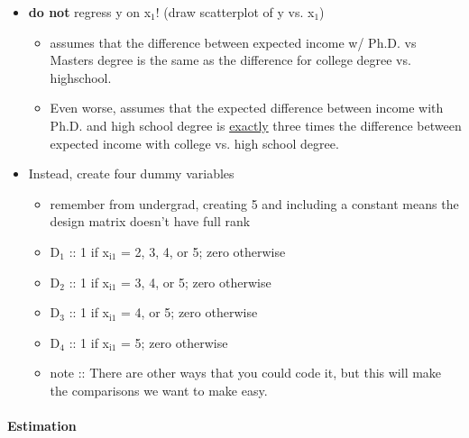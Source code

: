 \begin{itemize}
\item \textbf{do not} regress y on x$_1$! (draw scatterplot of y vs. x$_1$)
\begin{itemize}
\item assumes that the difference between expected income w/
          Ph.D. vs Masters degree is the same as the difference for
          college degree vs. highschool.
\item Even worse, assumes that the expected difference between
          income with Ph.D. and high school degree is \underline{exactly} three
          times the difference between expected income with college
          vs. high school degree.
\end{itemize}
\item Instead, create four dummy variables
\begin{itemize}
\item remember from undergrad, creating 5 and including a constant
          means the design matrix doesn't have full rank
\item D$_1$ :: 1 if x$_{\mathrm{i1}}$ = 2, 3, 4, or 5; zero otherwise
\item D$_2$ :: 1 if x$_{\mathrm{i1}}$ = 3, 4, or 5; zero otherwise
\item D$_3$ :: 1 if x$_{\mathrm{i1}}$ = 4, or 5; zero otherwise
\item D$_4$ :: 1 if x$_{\mathrm{i1}}$ = 5; zero otherwise
\item note :: There are other ways that you could code it, but
                  this will make the comparisons we want to make easy.
\end{itemize}
\end{itemize}
\paragraph{Estimation}
\label{sec-1-2-5}

